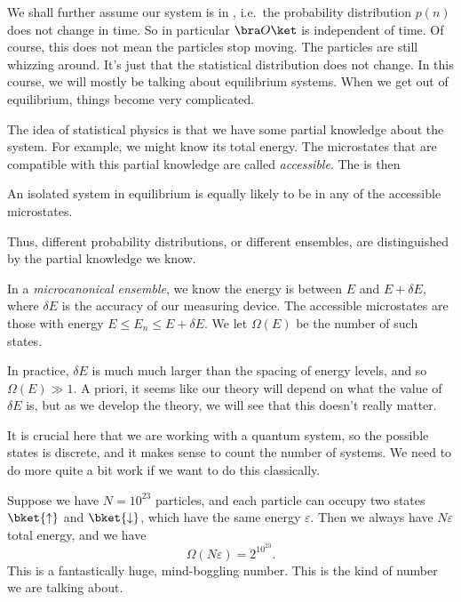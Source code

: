 \documentclass[a4paper]{article}
\begin{document}
We shall further assume our system is in , i.e.\ the probability distribution $p(n)$ does not change in time. So in particular $\bra O\ket$ is independent of time. Of course, this does not mean the particles stop moving. The particles are still whizzing around. It's just that the statistical distribution does not change. In this course, we will mostly be talking about equilibrium systems. When we get out of equilibrium, things become very complicated.

The idea of statistical physics is that we have some partial knowledge about the system. For example, we might know its total energy. The microstates that are compatible with this partial knowledge are called \emph{accessible}. The  is then
\begin{significant}
  An isolated system in equilibrium is equally likely to be in any of the accessible microstates.
\end{significant}
Thus, different probability distributions, or different ensembles, are distinguished by the partial knowledge we know.
\begin{defi}
  In a \emph{microcanonical ensemble}, we know the energy is between $E$ and $E + \delta E$, where $\delta E$ is the accuracy of our measuring device. The accessible microstates are those with energy $E \leq E_n \leq E + \delta E$. We let $\Omega(E)$ be the number of such states.
\end{defi}
In practice, $\delta E$ is much much larger than the spacing of energy levels, and so $\Omega(E) \gg 1$. A priori, it seems like our theory will depend on what the value of $\delta E$ is, but as we develop the theory, we will see that this doesn't really matter.

It is crucial here that we are working with a quantum system, so the possible states is discrete, and it makes sense to count the number of systems. We need to do more quite a bit work if we want to do this classically.

\begin{eg}
  Suppose we have $N = 10^{23}$ particles, and each particle can occupy two states $\bket{\uparrow}$ and $\bket{\downarrow}$, which have the same energy $\varepsilon$. Then we always have $N\varepsilon$ total energy, and we have
  \[
    \Omega(N\varepsilon) = 2^{10^{23}}.
  \]
  This is a fantastically huge, mind-boggling number. This is the kind of number we are talking about.
\end{eg}
\end{document}
